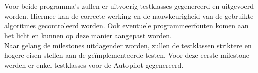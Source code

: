 
\\
\\
Voor beide programma's zullen er uitvoerig testklasses gegenereerd en uitgevoerd worden. Hiermee kan de correcte werking en de nauwkeurigheid van de gebruikte algoritmes gecontroleerd worden. Ook eventuele programmeerfouten komen aan het licht en kunnen op deze manier aangepast worden. 
\\
Naar gelang de milestones uitdagender worden, zullen de testklassen striktere en hogere eisen stellen aan de ge\"implementeerde testen. Voor deze eerste milestone werden er enkel testklasses voor de Autopilot gegenereerd.